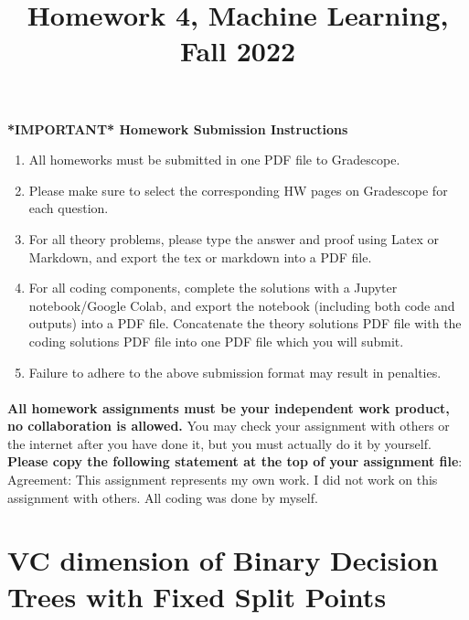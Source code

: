 \documentclass{exam}
\title{Homework 4, Machine Learning, Fall 2022}
\author{ }
\date{}
\begin{document}
\maketitle
\textbf{*IMPORTANT* Homework Submission Instructions}
\begin{enumerate}
    \item All homeworks must be submitted in one PDF file to Gradescope. 
    \item Please make sure to select the corresponding HW pages on Gradescope for each question.
    \item For all theory problems, please type the answer and proof using Latex or Markdown, and export the tex or markdown into a PDF file. 
    \item For all coding components, complete the solutions with a Jupyter notebook/Google Colab, and export the notebook (including both code and outputs) into a PDF file. Concatenate the theory solutions PDF file with the coding solutions PDF file into one PDF file which you will submit. 
    \item Failure to adhere to the above submission format may result in penalties.  
\end{enumerate}


\paragraph{} \textbf{All homework assignments must be your independent work product, no collaboration is allowed.} You may check your assignment with others or the internet after you have done it, but you must actually do it by yourself. \textbf{Please copy the following statement at the top of your assignment file}: \\

Agreement: This assignment represents my own work. I did not work on this assignment with others. All coding was done by myself. \\

\vspace{4in}

\newpage

\section{VC dimension of Binary Decision Trees with Fixed Split Points} 
\end{document}
